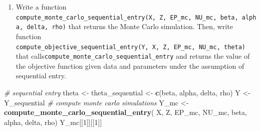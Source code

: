 \documentclass[]{book}
\newenvironment{Shaded}{\begin{snugshade}}{\end{snugshade}}
\newcommand{\KeywordTok}[1]{\textcolor[rgb]{0.13,0.29,0.53}{\textbf{#1}}}
\newcommand{\DataTypeTok}[1]{\textcolor[rgb]{0.13,0.29,0.53}{#1}}
\newcommand{\DecValTok}[1]{\textcolor[rgb]{0.00,0.00,0.81}{#1}}
\newcommand{\StringTok}[1]{\textcolor[rgb]{0.31,0.60,0.02}{#1}}
\newcommand{\CommentTok}[1]{\textcolor[rgb]{0.56,0.35,0.01}{\textit{#1}}}
\newcommand{\OperatorTok}[1]{\textcolor[rgb]{0.81,0.36,0.00}{\textbf{#1}}}
\newcommand{\NormalTok}[1]{#1}
\providecommand{\tightlist}{%
  \setlength{\itemsep}{0pt}\setlength{\parskip}{0pt}}
\begin{document}
\begin{Shaded}
\end{Shaded}

\begin{enumerate}
\def\labelenumi{\arabic{enumi}.}
\setcounter{enumi}{1}
\tightlist
\item
  Write a function
  \texttt{compute\_monte\_carlo\_sequential\_entry(X,\ Z,\ EP\_mc,\ NU\_mc,\ beta,\ alpha,\ delta,\ rho)}
  that returns the Monte Carlo simulation. Then, write function
  \texttt{compute\_objective\_sequential\_entry(Y,\ X,\ Z,\ EP\_mc,\ NU\_mc,\ theta)}
  that calls\texttt{compute\_monte\_carlo\_sequential\_entry} and
  returns the value of the objective function given data and parameters
  under the assumption of sequential entry.
\end{enumerate}

\begin{Shaded}
\begin{Highlighting}[]
\CommentTok{# sequential entry}
\NormalTok{theta <-}\StringTok{ }\NormalTok{theta_sequential <-}
\StringTok{  }\KeywordTok{c}\NormalTok{(beta, alpha, delta, rho)}
\NormalTok{Y <-}\StringTok{ }\NormalTok{Y_sequential}
\CommentTok{# compute monte carlo simulations }
\NormalTok{Y_mc <-}\StringTok{ }
\StringTok{  }\KeywordTok{compute_monte_carlo_sequential_entry}\NormalTok{(}
\NormalTok{    X, Z, EP_mc, NU_mc, beta, alpha, delta, rho)}
\NormalTok{Y_mc[[}\DecValTok{1}\NormalTok{]][[}\DecValTok{1}\NormalTok{]]}
\end{Highlighting}
\end{Shaded}
\end{document}
